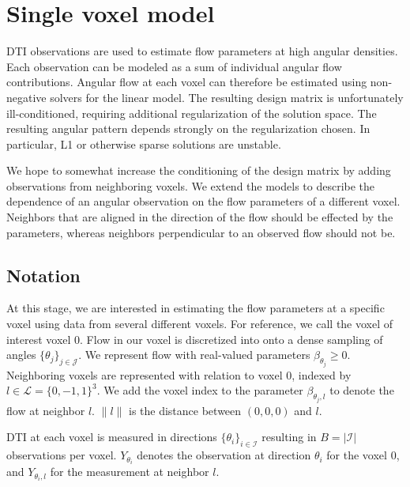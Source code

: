 \documentclass[11pt]{amsart}
\newcommand{\tj}{\theta_j}
\newcommand{\ti}{\theta_i}
\newcommand{\yti}{Y_{\theta_i}}
\newcommand{\ytil}{Y_{\theta_i,l}}
\begin{document}
\section{Single voxel model}
DTI observations are used to estimate flow parameters at high angular densities. 
Each observation can be modeled as a sum of individual angular flow contributions. 
Angular flow at each voxel can therefore be estimated using non-negative solvers for the linear model. 
The resulting design matrix is unfortunately ill-conditioned, requiring additional regularization of the solution space. 
The resulting angular pattern depends strongly on the regularization chosen. 
In particular, L1 or otherwise sparse solutions are unstable. 

We hope to somewhat increase the conditioning of the design matrix by adding observations 
from neighboring voxels. We extend the models to describe the dependence of 
an angular observation on the flow parameters of a different voxel. Neighbors 
that are aligned in the direction of the flow should be effected by the parameters,  
whereas neighbors perpendicular to an observed flow should not be. 

\subsection{Notation}

At this stage, we are interested in estimating the flow parameters at a 
specific voxel using data from several different voxels. 
For reference, we call the voxel of interest voxel 0. 
Flow in our voxel is discretized into onto a dense sampling of angles $\{\tj\}_{j \in \mathcal{J}}$. 
We represent flow with real-valued parameters $\beta_{\tj}\geq 0$.
Neighboring voxels are represented with relation to voxel $0$, indexed by $l \in \mathcal{L} = \{0,-1,1\}^3$. 
We add the voxel index to the parameter $\beta_{\tj, l}$ to denote the flow at neighbor $l$. 
$\|l\|$ is the distance between $(0,0,0)$ and $l$.

DTI at each voxel is measured in directions $\{\ti\}_{ i \in \mathcal{I}}$ resulting in  $B = |\mathcal{I}| $ observations per voxel.  
$\yti$ denotes the observation at direction $\ti$ for the voxel 0, and $\ytil$ for the 
measurement at neighbor $l$. 
\end{document}
